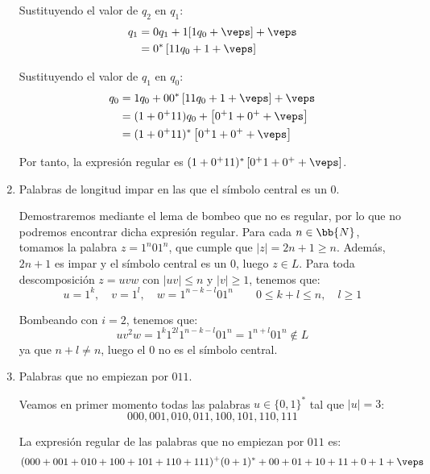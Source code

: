 \documentclass[12pt]{article}
\begin{document}
\begin{ejercicio}[2.5 puntos]
\begin{enumerate}
            Sustituyendo  el valor de $q_2$ en $q_1$:
            \begin{align*}
                q_1&=0q_1 + 1[1q_0 + \veps] + \veps\\
                &= 0^*\left[11q_0+1+\veps\right]
            \end{align*}

            Sustituyendo el valor de $q_1$ en $q_0$:
            \begin{align*}
                q_0&=1q_0 + 00^*\left[11q_0+1+\veps\right] + \veps\\
                &= (1+0^+11)q_0 + \left[0^+1 + 0^+ + \veps\right] \\
                &= (1+0^+11)^*\left[0^+1 + 0^+ + \veps\right]
            \end{align*}

            Por tanto, la expresión regular es $(1+0^+11)^*\left[0^+1 + 0^+ + \veps\right]$.
            \item Palabras de longitud impar en las que el símbolo central es un $0$.
            
            Demostraremos mediante el lema de bombeo que no es regular, por lo que no podremos encontrar dicha expresión regular.
            Para cada $n\in \bb{N}$, tomamos la palabra $z=1^{n}01^{n}$, que cumple que $|z|=2n+1\geq n$. Además, $2n+1$ es impar y el símbolo central es un $0$, luego $z\in L$.
            Para toda descomposición $z=uvw$ con $|uv|\leq n$ y $|v|\geq 1$, tenemos que:
            \begin{equation*}
                u=1^k,\quad v=1^l,\quad w=1^{n-k-l}01^{n}\qquad 0\leq k+l\leq n,\quad l\geq 1
            \end{equation*}

            Bombeando con $i=2$, tenemos que:
            \begin{equation*}
                uv^2w=1^{k}1^{2l}1^{n-k-l}01^{n}=1^{n+l}01^{n}\notin L
            \end{equation*}
            ya que $n+l\neq n$, luego el $0$ no es el símbolo central.
            \item Palabras que no empiezan por $011$.
            
            Veamos en primer momento todas las palabras $u\in \{0,1\}^*$ tal que $|u|=3$:
            \begin{equation*}
                000, 001, 010, 011, 100, 101, 110, 111
            \end{equation*}
            
            La expresión regular de las palabras que no empiezan por $011$ es:
            \begin{equation*}
                (000+001+010+100+101+110+111)^+(0+1)^* + 00 + 01 + 10 + 11 + 0 + 1 + \veps
            \end{equation*}
        \end{enumerate}
    \end{ejercicio}
\end{document}
